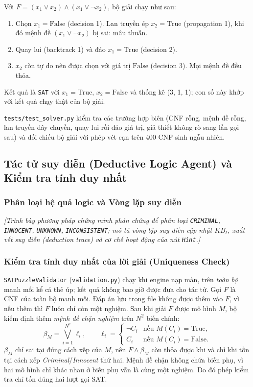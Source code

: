 \documentclass[12pt,a4paper]{article}
\begin{document}
Với $F = (x_1 \vee x_2) \wedge (x_1 \vee \neg x_2)$, bộ giải chạy như sau:
\begin{enumerate}
    \item Chọn $x_1 = \text{False}$ (decision 1). Lan truyền ép $x_2 = \text{True}$ (propagation 1), khi đó mệnh đề $(x_1 \vee \neg x_2)$ bị sai: mâu thuẫn.
    \item Quay lui (backtrack 1) và đảo $x_1 = \text{True}$ (decision 2).
    \item $x_2$ còn tự do nên được chọn với giá trị $\text{False}$ (decision 3). Mọi mệnh đề đều thỏa.
\end{enumerate}
Kết quả là \texttt{SAT} với $x_1 = \text{True}$, $x_2 = \text{False}$ và thống kê (3, 1, 1); con số này khớp với kết quả chạy thật của bộ giải.

\texttt{tests/test\_solver.py} kiểm tra các trường hợp biên (CNF rỗng, mệnh đề rỗng, lan truyền dây chuyền, quay lui rồi đảo giá trị, giả thiết không rò sang lần gọi sau) và đối chiếu bộ giải với phép vét cạn trên 400 CNF sinh ngẫu nhiên.

    \subsection{Tác tử suy diễn (Deductive Logic Agent) và Kiểm tra tính duy nhất}

    \subsubsection{Phân loại hệ quả logic và Vòng lặp suy diễn}
    \textit{[Trình bày phương pháp chứng minh phản chứng để phân loại \texttt{CRIMINAL}, \texttt{INNOCENT}, \texttt{UNKNOWN}, \texttt{INCONSISTENT}; mô tả vòng lặp suy diễn cập nhật $KB_t$, xuất vết suy diễn (\emph{deduction trace}) và cơ chế hoạt động của nút \texttt{Hint}.]}

    \subsubsection{Kiểm tra tính duy nhất của lời giải (Uniqueness Check)}
\label{sec:uniqueness}
\texttt{SATPuzzleValidator} (\texttt{validation.py}) chạy khi engine nạp màn, trên \emph{toàn bộ} manh mối kể cả thẻ úp; kết quả không bao giờ được đưa cho tác tử. Gọi $F$ là CNF của toàn bộ manh mối. Đáp án lưu trong file không được thêm vào $F$, vì nếu thêm thì $F$ luôn chỉ còn một nghiệm. Sau khi giải $F$ được mô hình $M$, bộ kiểm định thêm \emph{mệnh đề chặn nghiệm} trên $N^2$ biến chính:
\[
    \beta_M = \bigvee_{i=1}^{N^2} \ell_i, \qquad
    \ell_i = \begin{cases} \neg C_i & \text{nếu } M(C_i) = \text{True},\\ C_i & \text{nếu } M(C_i) = \text{False}. \end{cases}
\]
$\beta_M$ chỉ sai tại đúng cách xếp của $M$, nên $F \wedge \beta_M$ còn thỏa được khi và chỉ khi tồn tại cách xếp \emph{Criminal}/\emph{Innocent} thứ hai. Mệnh đề chặn không chứa biến phụ, vì hai mô hình chỉ khác nhau ở biến phụ vẫn là cùng một nghiệm. Do đó phép kiểm tra chỉ tốn đúng hai lượt gọi SAT.
\end{document}
